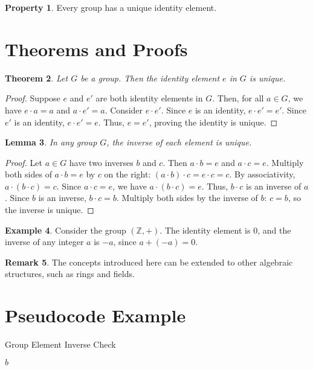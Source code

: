 \documentclass[11pt, a4paper]{article}
\theoremstyle{plain}
\newtheorem{theorem}{Theorem}[section]
\newtheorem{lemma}[theorem]{Lemma}
\theoremstyle{definition}
\newtheorem{property}[theorem]{Property}
\newtheorem{example}[theorem]{Example}
\newtheorem{remark}[theorem]{Remark}
\begin{document}
	\begin{property}
		Every group has a unique identity element.
	\end{property}
	
	\section{Theorems and Proofs}
	\begin{theorem}
		Let \( G \) be a group. Then the identity element \( e \) in \( G \) is unique.
	\end{theorem}
	\begin{proof}
		Suppose \( e \) and \( e' \) are both identity elements in \( G \). Then, for all \( a \in G \), we have \( e \cdot a = a \) and \( a \cdot e' = a \). Consider \( e \cdot e' \). Since \( e \) is an identity, \( e \cdot e' = e' \). Since \( e' \) is an identity, \( e \cdot e' = e \). Thus, \( e = e' \), proving the identity is unique.
	\end{proof}
	
	\begin{lemma}
		In any group \( G \), the inverse of each element is unique.
	\end{lemma}
	\begin{proof}
		Let \( a \in G \) have two inverses \( b \) and \( c \). Then \( a \cdot b = e \) and \( a \cdot c = e \). Multiply both sides of \( a \cdot b = e \) by \( c \) on the right: \( (a \cdot b) \cdot c = e \cdot c = c \). By associativity, \( a \cdot (b \cdot c) = c \). Since \( a \cdot c = e \), we have \( a \cdot (b \cdot c) = e \). Thus, \( b \cdot c \) is an inverse of \( a \). Since \( b \) is an inverse, \( b \cdot c = b \). Multiply both sides by the inverse of \( b \): \( c = b \), so the inverse is unique.
	\end{proof}
	
	\begin{example}
		Consider the group \( (\mathbb{Z}, +) \). The identity element is \( 0 \), and the inverse of any integer \( a \) is \( -a \), since \( a + (-a) = 0 \).
	\end{example}
	
	\begin{remark}
		The concepts introduced here can be extended to other algebraic structures, such as rings and fields.
	\end{remark}
	
	\section{Pseudocode Example}
	\begin{algorithm}
		\caption{Group Element Inverse Check}
		\begin{algorithmic}[1]
			\State \Return $b$
			\EndIf
			\EndFor
			\State \Return {}
			\EndProcedure
		\end{algorithmic}
	\end{algorithm}
	
\end{document}
